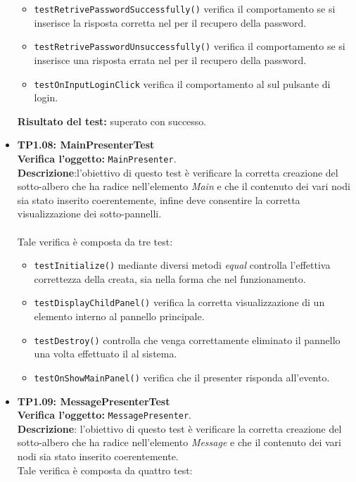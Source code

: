 \begin{itemize}
\begin{itemize}
\item \texttt{testRetrivePasswordSuccessfully()} verifica il comportamento se si inserisce la risposta corretta nel  per il recupero della password.

\item \texttt{testRetrivePasswordUnsuccessfully()} verifica il comportamento se si inserisce una risposta errata nel  per il recupero della password.

\item \texttt{testOnInputLoginClick} verifica il comportamento al  sul pulsante di login.

\end{itemize}
\textbf{Risultato del test:} superato con successo.

\item \textbf{TP1.08: MainPresenterTest}\\
\textbf{Verifica l'oggetto:} \texttt{MainPresenter}.\\
\textbf{Descrizione}:l'obiettivo di questo test è verificare la corretta creazione del sotto-albero che ha radice nell'elemento \textit{Main} e che il contenuto dei vari nodi sia stato inserito coerentemente, infine deve consentire la corretta visualizzazione dei sotto-pannelli.\\\\
Tale verifica è composta da tre test:
\begin{itemize}

\item \texttt{testInitialize()} mediante diversi metodi \textit{equal} controlla l'effettiva correttezza della  creata, sia nella forma che nel funzionamento.

\item \texttt{testDisplayChildPanel()} verifica la corretta visualizzazione di un elemento interno al pannello principale.

\item \texttt{testDestroy()} controlla che venga correttamente eliminato il pannello una volta effettuato il  al sistema.

\item \texttt{testOnShowMainPanel()} verifica che il presenter risponda all'evento.

\end{itemize}

\item \textbf{TP1.09: MessagePresenterTest}\\
\textbf{Verifica l'oggetto:} \texttt{MessagePresenter}.\\
\textbf{Descrizione}: l'obiettivo di questo test è verificare la corretta creazione del sotto-albero che ha radice nell'elemento \textit{Message} e che il contenuto dei vari nodi sia stato inserito coerentemente.\\
Tale verifica è composta da quattro test:
\begin{itemize}


\end{itemize}
\end{itemize}
